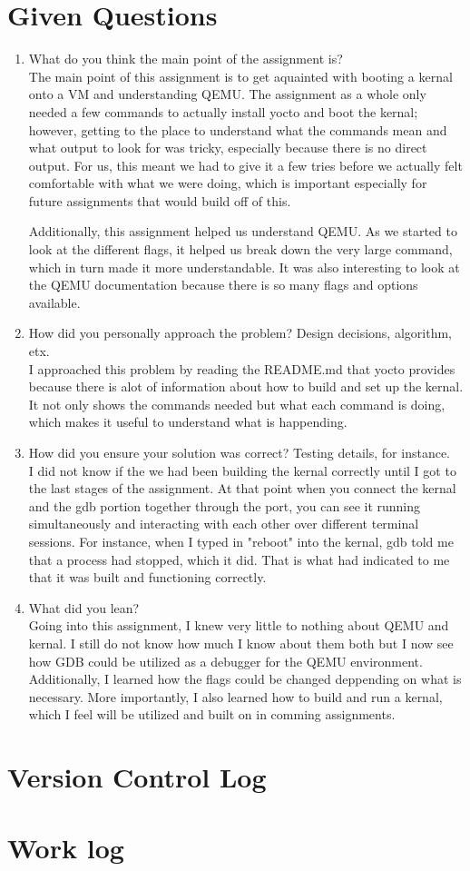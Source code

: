 \documentclass[10pt,draftclsnofoot]{article}
\begin{document}
\section{Given Questions}
\begin{enumerate}
\item{What do you think the main point of the assignment is?} \\
The main point of this assignment is to get aquainted with booting a kernal onto a VM
and understanding QEMU. The assignment as a whole only needed a few commands to 
actually install yocto and boot the kernal; however, getting to the place to 
understand what the commands mean and what output to look for was tricky, especially 
because there is no direct output. For us, this meant we had to give it a few tries 
before we actually felt comfortable with what we were doing, which is important 
especially for future assignments that would build off of this. \par
Additionally, this assignment helped us understand QEMU. As we started to look at the 
different flags, it helped us break down the very large command, which in turn made 
it more understandable. It was also interesting to look at the QEMU documentation 
because there is so many flags and options available. \par
\item{How did you personally approach the problem? Design decisions, algorithm, etx.} \\
I approached this problem by reading the README.md that yocto provides because there is alot of information about how to build and set up the kernal. It not only shows the 
commands needed but what each command is doing, which makes it useful to understand 
what is happending. \par
\item{How did you ensure your solution was correct? Testing details, for instance.} \\
I did not know if the we had been building the kernal correctly until I got to the last
stages of the assignment. At that point when you connect the kernal and the gdb portion 
together through the port, you can see it running simultaneously and interacting with 
each other over different terminal sessions. For instance, when I typed in "reboot" 
into the kernal, gdb told me that a process had stopped, which it did. That is what 
had indicated to me that it was built and functioning correctly. \par
\item{What did you lean?} \\
Going into this assignment, I knew very little to nothing about QEMU and kernal. I 
still do not know how much I know about them both but I now see how GDB could be 
utilized as a debugger for the QEMU environment. Additionally, I learned how the 
flags could be changed deppending on what is necessary. More importantly, I also
learned how to build and run a kernal, which I feel will be utilized and built on in 
comming assignments. \par
\end{enumerate}
\section{Version Control Log}

\section{Work log}
\end{document}
